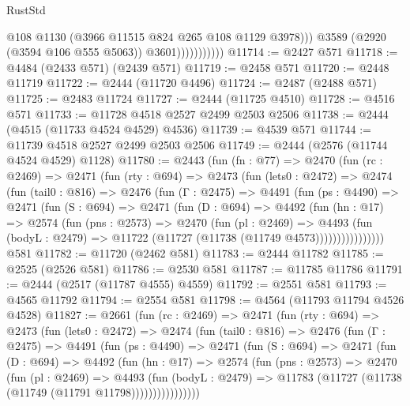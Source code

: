 \begin{lexlean}{RustStd}
\begin{coremodule}
                              @108
                              @1130
                              (@3966 @11515 @824 @265 @108 @1129 @3978)))
                          @3589
                          (@2920 (@3594 @106 @555 @5063))
                          @3601)))))))))))
@11714 := @2427 @571
@11718 := @4484 (@2433 @571) (@2439 @571)
@11719 := @2458 @571
@11720 := @2448 @11719
@11722 := @2444 (@11720 @4496)
@11724 := @2487 (@2488 @571)
@11725 := @2483 @11724
@11727 := @2444 (@11725 @4510)
@11728 := @4516 @571
@11733 := @11728 @4518 @2527 @2499 @2503 @2506
@11738 := @2444 (@4515 (@11733 @4524 @4529) @4536)
@11739 := @4539 @571
@11744 := @11739 @4518 @2527 @2499 @2503 @2506
@11749 := @2444 (@2576 (@11744 @4524 @4529) @1128)
@11780 := @2443
    (fun (fn : @77) =>
    @2470
      (fun (rc : @2469) =>
      @2471
        (fun (rty : @694) =>
        @2473
          (fun (lets0 : @2472) =>
          @2474
            (fun (tail0 : @816) =>
            @2476
              (fun (Γ : @2475) =>
              @4491
                (fun (ps : @4490) =>
                @2471
                  (fun (S : @694) =>
                  @2471
                    (fun (D : @694) =>
                    @4492
                      (fun (hn : @17) =>
                      @2574
                        (fun (pns : @2573) =>
                        @2470
                          (fun (pl : @2469) =>
                          @4493
                            (fun (bodyL : @2479) =>
                            @11722 (@11727 (@11738 (@11749 @4573))))))))))))))))
    @581
@11782 := @11720 (@2462 @581)
@11783 := @2444 @11782
@11785 := @2525 (@2526 @581)
@11786 := @2530 @581
@11787 := @11785 @11786
@11791 := @2444 (@2517 (@11787 @4555) @4559)
@11792 := @2551 @581
@11793 := @4565 @11792
@11794 := @2554 @581
@11798 := @4564 (@11793 @11794 @4526 @4528)
@11827 := @2661
    (fun (rc : @2469) =>
    @2471
      (fun (rty : @694) =>
      @2473
        (fun (lets0 : @2472) =>
        @2474
          (fun (tail0 : @816) =>
          @2476
            (fun (Γ : @2475) =>
            @4491
              (fun (ps : @4490) =>
              @2471
                (fun (S : @694) =>
                @2471
                  (fun (D : @694) =>
                  @4492
                    (fun (hn : @17) =>
                    @2574
                      (fun (pns : @2573) =>
                      @2470
                        (fun (pl : @2469) =>
                        @4493
                          (fun (bodyL : @2479) =>
                          @11783 (@11727 (@11738 (@11749 (@11791 @11798))))))))))))))))

\end{coremodule}
\end{lexlean}

